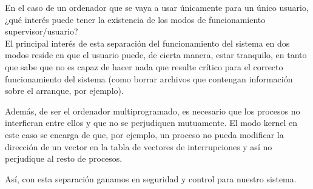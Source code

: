 \begin{ejercicio}\label{ej:2.Ejercicio8}
    En el caso de un ordenador que se vaya a usar únicamente para un único usuario, ¿qué interés puede tener la existencia de los modos de funcionamiento supervisor/usuario? \\

    El principal interés de esta separación del funcionamiento del sistema en dos modos reside en que el usuario puede, de cierta manera, estar tranquilo, en tanto que sabe que no es capaz de hacer nada que resulte crítico para el correcto funcionamiento del sistema (como borrar archivos que contengan información sobre el arranque, por ejemplo).
    
    Además, de ser el ordenador multiprogramado, es necesario que los procesos no interfieran entre ellos y que no se perjudiquen mutuamente. El modo kernel en este caso se encarga de que, por ejemplo, un proceso no pueda modificar la dirección de un vector en la tabla de vectores de interrupciones y así no perjudique al resto de procesos.
    
    Así, con esta separación ganamos en seguridad y control para nuestro sistema.
    
    \begin{comment}
    El principal interés de esta separación del funcionamiento del sistema en dos modos reside en que, si el usuario no accede deliberadamente al modo supervisor o kernel; entonces puede, de cierta manera, estar tranquilo, en tanto que sabe que no es capaz de hacer nada que resulte crítico para el correcto funcionamiento del sistema (como borrar archivos que contengan información sobre el arranque, por ejemplo). Sin embargo, este único usuario también podría acceder al modo kernel si lo requiriese para cualquier tarea. 
    
    Así, con esta separación ganamos en seguridad y control para nuestro sistema.
    \end{comment}
\end{ejercicio}


